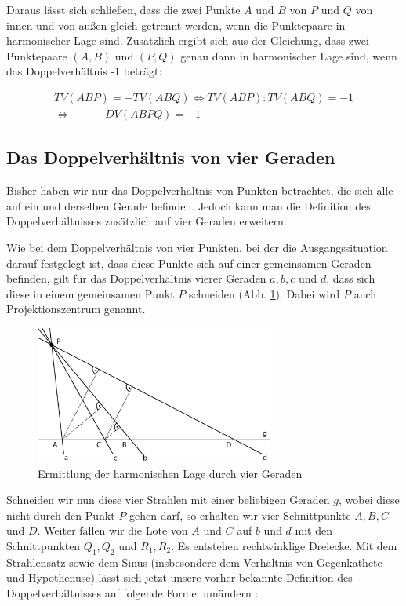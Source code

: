 \documentclass[12pt,a4paper]{article}
\begin{document}
Daraus lässt sich schließen, dass die zwei Punkte $A$ und $B$ von $P$ und $Q$ von innen und von außen gleich getrennt werden, wenn die Punktepaare in harmonischer Lage sind. Zusätzlich ergibt sich aus der Gleichung, dass zwei Punktepaare $(A, B)$ und $(P, Q)$ genau dann in harmonischer Lage sind, wenn das Doppelverhältnis -1 beträgt:

\begin{equation*}
\begin{split}
TV(A B P) = -TV(A B Q) \Longleftrightarrow TV(A B P) : TV(A B Q) = -1 \\ \Longleftrightarrow ~~~~~~~~~~~~~~DV(A B P Q) = -1
\end{split}
\end{equation*}

\subsection{Das Doppelverhältnis von vier Geraden}

Bisher haben wir nur das Doppelverhältnis von Punkten betrachtet, die sich alle auf ein und derselben Gerade befinden. Jedoch kann man die Definition des Doppelverhältnisses zusätzlich auf vier Geraden erweitern.

Wie bei dem Doppelverhältnis von vier Punkten, bei der die Ausgangssituation darauf festgelegt ist, dass diese Punkte sich auf einer gemeinsamen Geraden befinden, gilt für das Doppelverhältnis vierer Geraden $a, b, c$ und $d$, dass sich diese in einem gemeinsamen Punkt $P$ schneiden (Abb. \ref{fig:vierGeraden}). Dabei wird $P$ auch Projektionszentrum genannt.

\begin{figure}[htbp] 
\centering
\includegraphics[width=0.7\textwidth]{Bilder/vierGeraden.png}
\caption{Ermittlung der harmonischen Lage durch vier Geraden}
\label{fig:vierGeraden}
\end{figure}

Schneiden wir nun diese vier Strahlen mit einer beliebigen Geraden $g$, wobei diese nicht durch den Punkt $P$ gehen darf, so erhalten wir vier Schnittpunkte $A, B, C$ und $D$. Weiter fällen wir die Lote von $A$ und $C$ auf $b$ und $d$ mit den Schnittpunkten $Q_1, Q_2$ und $R_1, R_2$. Es entstehen rechtwinklige Dreiecke. Mit dem Strahlensatz sowie dem Sinus (insbesondere dem Verhältnis von Gegenkathete und Hypothenuse) lässt sich jetzt unsere vorher bekannte Definition des Doppelverhältnisses auf folgende Formel umändern \citep[s.~][S.~80]{projektiveGeometrie}: 
\end{document}
